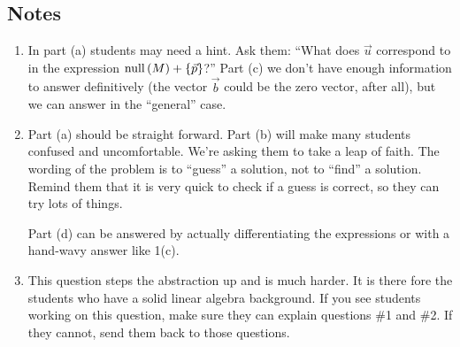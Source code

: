 \subsection*{Notes}
	\begin{enumerate}
			\item In part (a) students may need a hint. Ask them: ``What does $\vec u$ correspond to in the expression $\mathrm{null}\,(M)+\{\vec p\}$?''
			Part (c) we don't have enough information to answer definitively (the vector $\vec b$ could be the zero vector, after all), but we can
			answer in the ``general'' case.

			\item Part (a) should be straight forward. Part (b) will make many students confused and uncomfortable. We're asking them to take
			a leap of faith. The wording of the problem is to ``guess'' a solution, not to ``find'' a solution. Remind them that it is very quick
			to check if a guess is correct, so they can try lots of things.

			Part (d) can be answered by actually differentiating the expressions or with a hand-wavy answer like 1(c).

			\item This question steps the abstraction up and is much harder. It is there fore the students who have a solid linear
			algebra background. If you see students working on this question, make sure they can explain questions \#1 and \#2. If they
			cannot, send them back to those questions.
	\end{enumerate}
